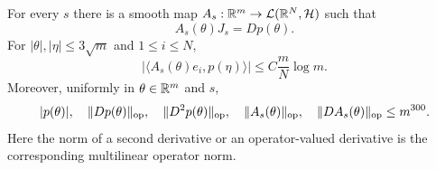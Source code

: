 \begin{lemma}
\label{ker:extension}
For every $s$ there is a smooth map
$A_s:\mathbb R^m\to\mathcal L(\mathbb R^N,\mathcal H)$ such that
\begin{equation}
\label{ker:extension-identity}
 A_s(\theta)J_s=Dp(\theta).
\end{equation}
For $|\theta|,|\eta|\le3\sqrt m$ and $1\le i\le N$,
\begin{equation}
\label{ker:profile}
 \bigl|\langle A_s(\theta)e_i,p(\eta)\rangle\bigr|
 \le C\frac{m}{N}\log m.
\end{equation}
Moreover, uniformly in $\theta\in\mathbb R^m$ and $s$,
\begin{equation}
\label{ker:strong-bounds}
 |p(\theta)|,\quad \|Dp(\theta)\|_{\mathrm{op}},\quad
 \|D^2p(\theta)\|_{\mathrm{op}},\quad
 \|A_s(\theta)\|_{\mathrm{op}},\quad
 \|DA_s(\theta)\|_{\mathrm{op}}\le m^{300}.
\end{equation}
Here the norm of a second derivative or an operator-valued derivative is
the corresponding multilinear operator norm.
\end{lemma}

